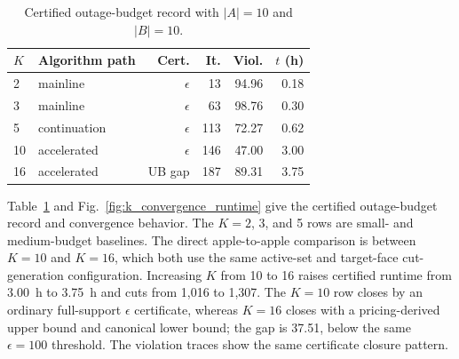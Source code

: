 \begin{table}[!t]
\centering
\caption{Certified outage-budget record with $|A|=10$ and $|B|=10$.}
\label{tab:k_scaling}
\scriptsize
\begin{tabular}{llrrrr}
\toprule
$K$ & Algorithm path & Cert. & It. & Viol. & $t$ (h) \\
\midrule
2 & mainline & $\epsilon$ & 13 & 94.96 & 0.18 \\
3 & mainline & $\epsilon$ & 63 & 98.76 & 0.30 \\
5 & continuation & $\epsilon$ & 113 & 72.27 & 0.62 \\
10 & accelerated & $\epsilon$ & 146 & 47.00 & 3.00 \\
16 & accelerated & UB gap & 187 & 89.31 & 3.75 \\
\bottomrule
\end{tabular}
\end{table}

Table~\ref{tab:k_scaling} and Fig.~\ref{fig:k_convergence_runtime} give the
certified outage-budget record and convergence behavior. The $K=2$, 3, and 5
rows are small- and medium-budget baselines. The direct apple-to-apple
comparison is between $K=10$ and $K=16$, which both use the same active-set
and target-face cut-generation configuration. Increasing $K$ from 10 to 16
raises certified runtime from 3.00~h to 3.75~h and cuts from 1,016 to 1,307.
The $K=10$ row closes by an ordinary full-support $\epsilon$ certificate,
whereas $K=16$ closes with a pricing-derived upper bound and canonical lower
bound; the gap is 37.51, below the same $\epsilon=100$ threshold. The
violation traces show the same certificate closure pattern.

